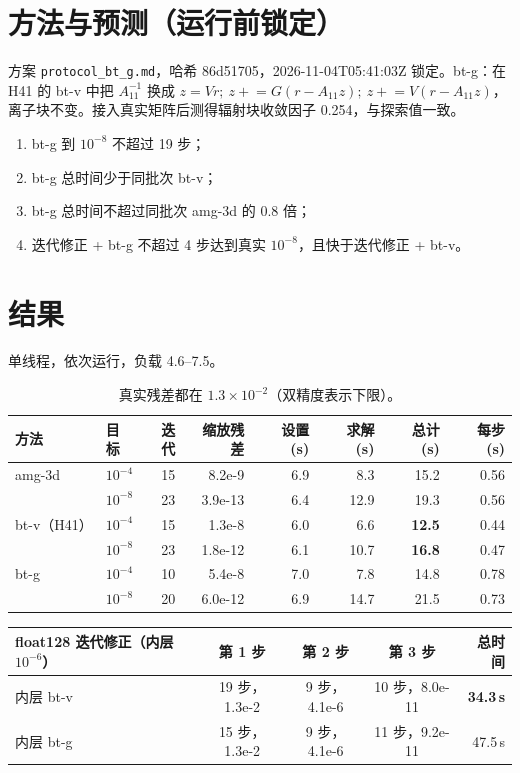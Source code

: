 \documentclass[11pt,a4paper]{ctexart}
\begin{document}
\section{方法与预测（运行前锁定）}
方案 \texttt{protocol\_bt\_g.md}，哈希 86d51705，2026-11-04T05:41:03Z 锁定。bt-g：在 H41 的 bt-v 中把 $A_{11}^{-1}$ 换成
$z=Vr;\ z\mathrel{+}=G(r-A_{11}z);\ z\mathrel{+}=V(r-A_{11}z)$，离子块不变。接入真实矩阵后测得辐射块收敛因子 0.254，与探索值一致。
\begin{enumerate}
\item bt-g 到 $10^{-8}$ 不超过 19 步；
\item bt-g 总时间少于同批次 bt-v；
\item bt-g 总时间不超过同批次 amg-3d 的 0.8 倍；
\item 迭代修正 + bt-g 不超过 4 步达到真实 $10^{-8}$，且快于迭代修正 + bt-v。
\end{enumerate}

\section{结果}
单线程，依次运行，负载 4.6--7.5。
\begin{table}[H]
\centering
\small
\begin{tabular}{llrrrrrr}
\toprule
方法 & 目标 & 迭代 & 缩放残差 & 设置 (s) & 求解 (s) & 总计 (s) & 每步 (s) \\
\midrule
amg-3d & $10^{-4}$ & 15 & 8.2e-9 & 6.9 & 8.3 & 15.2 & 0.56 \\
 & $10^{-8}$ & 23 & 3.9e-13 & 6.4 & 12.9 & 19.3 & 0.56 \\
bt-v（H41） & $10^{-4}$ & 15 & 1.3e-8 & 6.0 & 6.6 & \textbf{12.5} & 0.44 \\
 & $10^{-8}$ & 23 & 1.8e-12 & 6.1 & 10.7 & \textbf{16.8} & 0.47 \\
bt-g & $10^{-4}$ & 10 & 5.4e-8 & 7.0 & 7.8 & 14.8 & 0.78 \\
 & $10^{-8}$ & 20 & 6.0e-12 & 6.9 & 14.7 & 21.5 & 0.73 \\
\bottomrule
\end{tabular}
\caption{真实残差都在 $1.3\times10^{-2}$（双精度表示下限）。}
\end{table}
\begin{table}[H]
\centering
\small
\begin{tabular}{lcccr}
\toprule
float128 迭代修正（内层 $10^{-6}$） & 第 1 步 & 第 2 步 & 第 3 步 & 总时间 \\
\midrule
内层 bt-v & 19 步，1.3e-2 & 9 步，4.1e-6 & 10 步，8.0e-11 & \textbf{34.3\,s} \\
内层 bt-g & 15 步，1.3e-2 & 9 步，4.1e-6 & 11 步，9.2e-11 & 47.5\,s \\
\bottomrule
\end{tabular}
\end{table}
\end{document}
